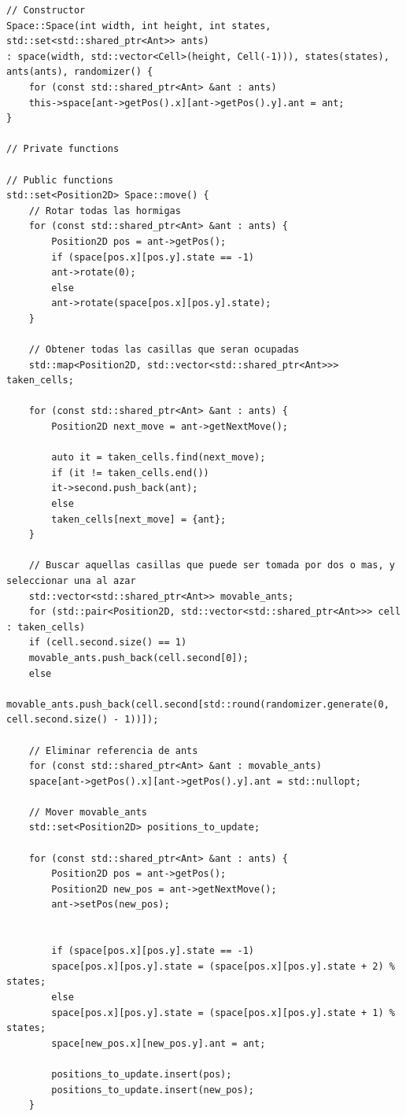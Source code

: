 \documentclass[12pt,twoside]{article}
\begin{document}
\begin{lstlisting}[caption={Space.cpp}, label={lst:cppexample}]
// Constructor
Space::Space(int width, int height, int states, std::set<std::shared_ptr<Ant>> ants)
: space(width, std::vector<Cell>(height, Cell(-1))), states(states), ants(ants), randomizer() {
	for (const std::shared_ptr<Ant> &ant : ants)
	this->space[ant->getPos().x][ant->getPos().y].ant = ant;
}

// Private functions

// Public functions
std::set<Position2D> Space::move() {
	// Rotar todas las hormigas
	for (const std::shared_ptr<Ant> &ant : ants) {
		Position2D pos = ant->getPos();
		if (space[pos.x][pos.y].state == -1)
		ant->rotate(0);
		else
		ant->rotate(space[pos.x][pos.y].state);
	}
	
	// Obtener todas las casillas que seran ocupadas
	std::map<Position2D, std::vector<std::shared_ptr<Ant>>> taken_cells;
	
	for (const std::shared_ptr<Ant> &ant : ants) {
		Position2D next_move = ant->getNextMove();
		
		auto it = taken_cells.find(next_move);
		if (it != taken_cells.end())
		it->second.push_back(ant);
		else
		taken_cells[next_move] = {ant};
	}
	
	// Buscar aquellas casillas que puede ser tomada por dos o mas, y seleccionar una al azar
	std::vector<std::shared_ptr<Ant>> movable_ants;
	for (std::pair<Position2D, std::vector<std::shared_ptr<Ant>>> cell : taken_cells)
	if (cell.second.size() == 1)
	movable_ants.push_back(cell.second[0]);
	else
	movable_ants.push_back(cell.second[std::round(randomizer.generate(0, cell.second.size() - 1))]);
	
	// Eliminar referencia de ants
	for (const std::shared_ptr<Ant> &ant : movable_ants)
	space[ant->getPos().x][ant->getPos().y].ant = std::nullopt;
	
	// Mover movable_ants
	std::set<Position2D> positions_to_update;
	
	for (const std::shared_ptr<Ant> &ant : ants) {
		Position2D pos = ant->getPos();
		Position2D new_pos = ant->getNextMove();
		ant->setPos(new_pos);
		
		
		if (space[pos.x][pos.y].state == -1)
		space[pos.x][pos.y].state = (space[pos.x][pos.y].state + 2) % states;
		else
		space[pos.x][pos.y].state = (space[pos.x][pos.y].state + 1) % states;
		space[new_pos.x][new_pos.y].ant = ant;
		
		positions_to_update.insert(pos);
		positions_to_update.insert(new_pos);
	}
	

\end{lstlisting}
\end{document}
